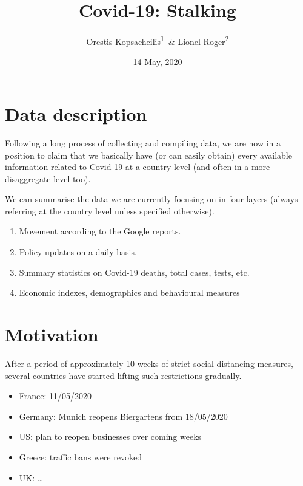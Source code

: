 \documentclass[
  english,
  ,doc,floatsintext]{apa6}
\author{Orestis Kopsacheilis\textsuperscript{1}\ \& Lionel Roger\textsuperscript{2}}
\affiliation{
\vspace{0.5cm}
\textsuperscript{1} School of Economics, University of Nottingham\\\textsuperscript{2} ODI}
\title{Covid-19: Stalking}
\date{14 May, 2020}
\providecommand{\tightlist}{%
  \setlength{\itemsep}{0pt}\setlength{\parskip}{0pt}}
\begin{document}
\maketitle

{
\setcounter{tocdepth}{2}
\tableofcontents
}
\hypertarget{data-description}{%
\section{Data description}\label{data-description}}

Following a long process of collecting and compiling data, we are now in a position to claim that we basically have (or can easily obtain) every available information related to Covid-19 at a country level (and often in a more disaggregate level too).

We can summarise the data we are currently focusing on in four layers (always referring at the country level unless specified otherwise).

\begin{enumerate}
\def\labelenumi{\arabic{enumi}.}
\tightlist
\item
  Movement according to the Google reports.
\item
  Policy updates on a daily basis.
\item
  Summary statistics on Covid-19 deaths, total cases, tests, etc.
\item
  Economic indexes, demographics and behavioural measures
\end{enumerate}

\hypertarget{motivation}{%
\section{Motivation}\label{motivation}}

After a period of approximately 10 weeks of strict social distancing measures, several countries have started lifting such restrictions gradually.

\begin{itemize}
\tightlist
\item
  France: 11/05/2020
\item
  Germany: Munich reopens Biergartens from 18/05/2020
\item
  US: plan to reopen businesses over coming weeks
\item
  Greece: traffic bans were revoked
\item
  UK: \ldots{}
\end{itemize}
\end{document}
